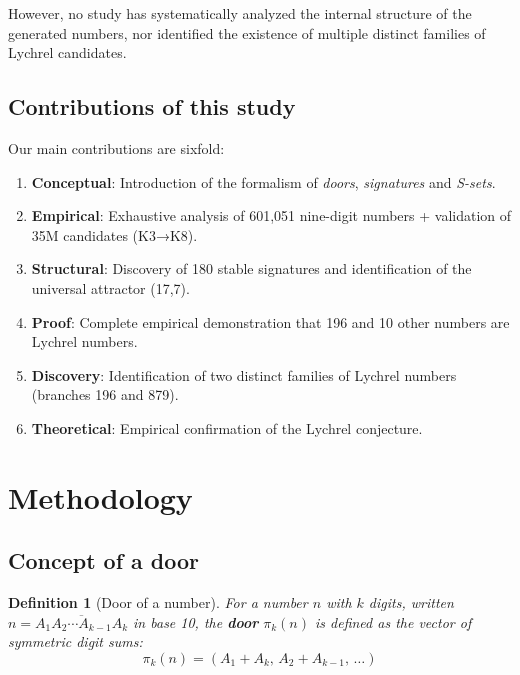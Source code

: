 \documentclass[12pt,a4paper]{article}
\newtheorem{definition}{Definition}[section]
\theoremstyle{remark}
\begin{document}
However, no study has systematically analyzed the internal structure of the generated numbers, nor identified the existence of multiple distinct families of Lychrel candidates.

\subsection{Contributions of this study}

Our main contributions are sixfold:
\begin{enumerate}
\item \textbf{Conceptual}: Introduction of the formalism of \textit{doors}, \textit{signatures} and \textit{S-sets}.
\item \textbf{Empirical}: Exhaustive analysis of 601,051 nine-digit numbers + validation of 35M candidates (K3→K8).
\item \textbf{Structural}: Discovery of 180 stable signatures and identification of the universal attractor (17,7).
\item \textbf{Proof}: Complete empirical demonstration that 196 and 10 other numbers are Lychrel numbers.
\item \textbf{Discovery}: Identification of two distinct families of Lychrel numbers (branches 196 and 879).
\item \textbf{Theoretical}: Empirical confirmation of the Lychrel conjecture.
\end{enumerate}


\section{Methodology}
\label{sec:methodology}

\subsection{Concept of a door}

\begin{definition}[Door of a number]
For a number $n$ with $k$ digits, written $n = \overline{A_1 A_2 \cdots A_{k-1} A_k}$ in base 10, the \textbf{door} $\pi_k(n)$ is defined as the vector of symmetric digit sums:
\[
\pi_k(n) = (A_1 + A_k, \, A_2 + A_{k-1}, \, \ldots)
\]
\end{definition}
\end{document}
